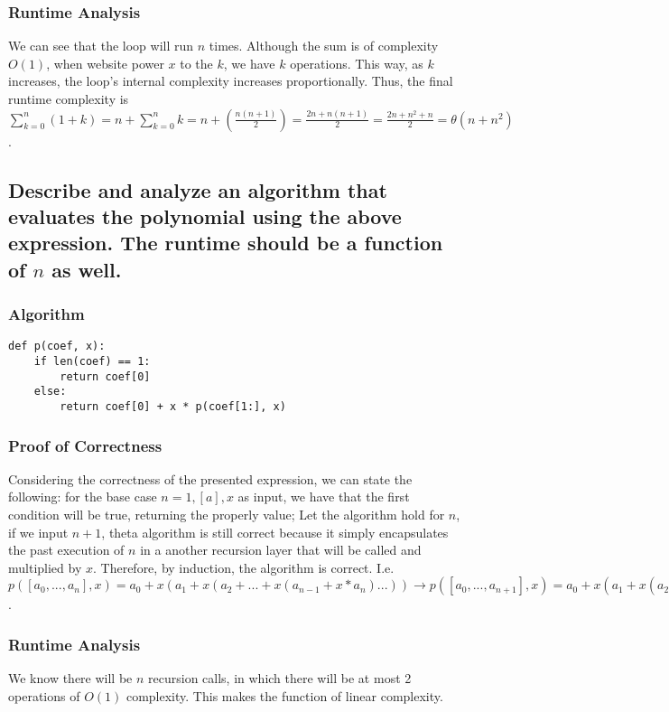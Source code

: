 \documentclass[11pt]{article}
\begin{document}
\subsubsection{Runtime Analysis}
\label{sec:org1665022}
We can see that the loop will run \(n\) times. Although the sum is of complexity \(O(1)\), when website power \(x\) to the \(k\), we have \(k\) operations. This way, as \(k\) increases, the loop's internal complexity increases proportionally. Thus, the final runtime complexity is \(\sum_{k=0}^{n}(1 + k) = n + \sum_{k=0}^{n}k = n + (\frac{n(n+1)}{2}) = \frac{2n + n(n+1)}{2} = \frac{2n + n^2 +n}{2} = \theta(n+n^2)\).\\
\subsection{Describe and analyze an algorithm that evaluates the polynomial using the above expression. The runtime should be a function of \(n\) as well.}
\label{sec:org97ebd1a}
\subsubsection{Algorithm}
\label{sec:org4c412d9}
\begin{verbatim}
def p(coef, x):
    if len(coef) == 1:
        return coef[0]
    else:
        return coef[0] + x * p(coef[1:], x)
\end{verbatim}
\subsubsection{Proof of Correctness}
\label{sec:org096bf9e}
Considering the correctness of the presented expression, we can state the following: for the base case \(n=1, [a], x\) as input, we have that the first condition will be true, returning the properly value; Let the algorithm hold for \(n\), if we input \(n+1\), theta algorithm is still correct because it simply encapsulates the past execution of \(n\) in a another recursion layer that will be called and multiplied by \(x\). Therefore, by induction, the algorithm is correct. I.e. \(p([a_0, ..., a_n], x) = a_0+x(a_1+x(a_2+...+x(a_{n−1}+x*a_n)...)) \to p([a_0, ..., a_{n+1}], x) = a_0+x(a_1+x(a_2+...+x(a_{n}+x*a_{n+1})...)) = p([a_0, ..., a_n], x) + a_{n+1}*x\).\\
\subsubsection{Runtime Analysis}
\label{sec:org0e52485}
We know there will be \(n\) recursion calls, in which there will be at most 2 operations of \(O(1)\) complexity. This makes the function of linear complexity.\\

\newpage\\
\\
\\
\end{document}
